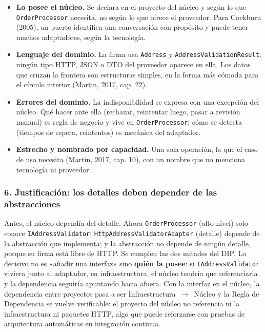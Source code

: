 \documentclass[11pt,a4paper]{article}
\begin{document}
\begin{itemize}[leftmargin=1.4em]
\item \textbf{Lo posee el núcleo.} Se declara en el proyecto del núcleo y según lo que
\texttt{OrderProcessor} necesita, no según lo que ofrece el proveedor. Para Cockburn (2005),
un puerto identifica una conversación con propósito y puede tener muchos adaptadores, según la
tecnología.
\item \textbf{Lenguaje del dominio.} La firma usa \texttt{Address} y
\texttt{AddressValidationResult}; ningún tipo HTTP, JSON o DTO del proveedor aparece en ella.
Los datos que cruzan la frontera son estructuras simples, en la forma más cómoda para el
círculo interior (Martin, 2017, cap. 22).
\item \textbf{Errores del dominio.} La indisponibilidad se expresa con una excepción del
núcleo. Qué hacer ante ella (rechazar, reintentar luego, pasar a revisión manual) es regla de
negocio y vive en \texttt{OrderProcessor}; cómo se detecta (tiempos de espera, reintentos) es
mecánica del adaptador.
\item \textbf{Estrecho y nombrado por capacidad.} Una sola operación, la que el caso de uso
necesita (Martin, 2017, cap. 10), con un nombre que no menciona tecnología ni proveedor.
\end{itemize}

\subsubsection*{6. Justificación: los detalles deben depender de las abstracciones}

Antes, el núcleo dependía del detalle. Ahora \texttt{OrderProcessor} (alto nivel) solo conoce
\texttt{IAddressValidator}; \texttt{HttpAddressValidatorAdapter} (detalle) depende de la
abstracción que implementa; y la abstracción no depende de ningún detalle, porque su firma
está libre de HTTP. Se cumplen las dos mitades del DIP. Lo decisivo no es «añadir una
interfaz» sino \textbf{quién la posee}: si \texttt{IAddressValidator} viviera junto al
adaptador, en infraestructura, el núcleo tendría que referenciarla y la dependencia seguiría
apuntando hacia afuera. Con la interfaz en el núcleo, la dependencia entre proyectos pasa a ser
Infraestructura~$\rightarrow$~Núcleo y la Regla de Dependencia se vuelve verificable: el
proyecto del núcleo no referencia ni la infraestructura ni paquetes HTTP, algo que puede
reforzarse con pruebas de arquitectura automáticas en integración continua.
\end{document}
